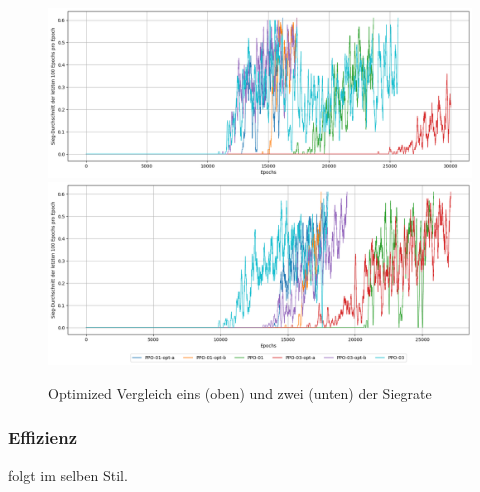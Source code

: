 \begin{figure}[H]
	\centering
	\includegraphics[scale=0.4517]{Abbildungen/Evaluation/win-rate_optimized_01.png}
	\includegraphics[scale=0.4515]{Abbildungen/Evaluation/win-rate_optimized_02.png}
	\caption[Optimized Vergleich Siegrate]{Optimized Vergleich eins (oben) und zwei (unten) der Siegrate}
	\label{fig:Optimized_Winrate}
\end{figure}

\subsubsection{Effizienz}
folgt im selben Stil.


